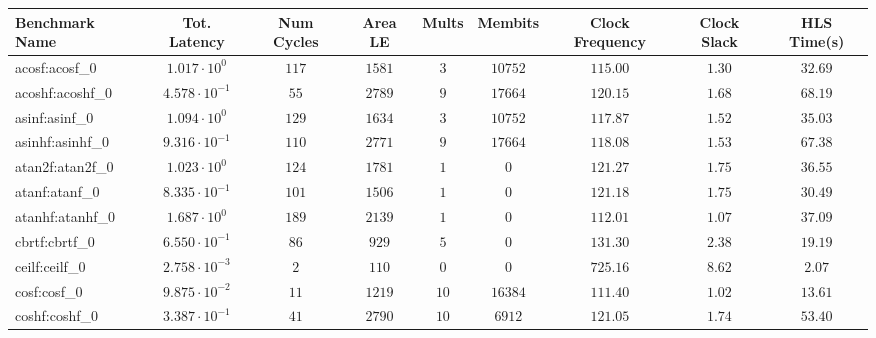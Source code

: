 \begin{tabular}{|l|c|c|c|c|c|c|c|c|}
\hline
Benchmark Name               & Tot. Latency            & Num Cycles & Area LE   & Mults   & Membits    & Clock Frequency & Clock Slack & HLS Time(s) \\
\hline
acosf:acosf\_0               & $ 1.017 \cdot 10^{0}  $ & $ 117    $ & $ 1581  $ & $ 3   $ & $ 10752  $ & $ 115.00      $ & $ 1.30    $ & $ 32.69   $ \\
acoshf:acoshf\_0             & $ 4.578 \cdot 10^{-1} $ & $ 55     $ & $ 2789  $ & $ 9   $ & $ 17664  $ & $ 120.15      $ & $ 1.68    $ & $ 68.19   $ \\
asinf:asinf\_0               & $ 1.094 \cdot 10^{0}  $ & $ 129    $ & $ 1634  $ & $ 3   $ & $ 10752  $ & $ 117.87      $ & $ 1.52    $ & $ 35.03   $ \\
asinhf:asinhf\_0             & $ 9.316 \cdot 10^{-1} $ & $ 110    $ & $ 2771  $ & $ 9   $ & $ 17664  $ & $ 118.08      $ & $ 1.53    $ & $ 67.38   $ \\
atan2f:atan2f\_0             & $ 1.023 \cdot 10^{0}  $ & $ 124    $ & $ 1781  $ & $ 1   $ & $ 0      $ & $ 121.27      $ & $ 1.75    $ & $ 36.55   $ \\
atanf:atanf\_0               & $ 8.335 \cdot 10^{-1} $ & $ 101    $ & $ 1506  $ & $ 1   $ & $ 0      $ & $ 121.18      $ & $ 1.75    $ & $ 30.49   $ \\
atanhf:atanhf\_0             & $ 1.687 \cdot 10^{0}  $ & $ 189    $ & $ 2139  $ & $ 1   $ & $ 0      $ & $ 112.01      $ & $ 1.07    $ & $ 37.09   $ \\
cbrtf:cbrtf\_0               & $ 6.550 \cdot 10^{-1} $ & $ 86     $ & $ 929   $ & $ 5   $ & $ 0      $ & $ 131.30      $ & $ 2.38    $ & $ 19.19   $ \\
ceilf:ceilf\_0               & $ 2.758 \cdot 10^{-3} $ & $ 2      $ & $ 110   $ & $ 0   $ & $ 0      $ & $ 725.16      $ & $ 8.62    $ & $ 2.07    $ \\
cosf:cosf\_0                 & $ 9.875 \cdot 10^{-2} $ & $ 11     $ & $ 1219  $ & $ 10  $ & $ 16384  $ & $ 111.40      $ & $ 1.02    $ & $ 13.61   $ \\
coshf:coshf\_0               & $ 3.387 \cdot 10^{-1} $ & $ 41     $ & $ 2790  $ & $ 10  $ & $ 6912   $ & $ 121.05      $ & $ 1.74    $ & $ 53.40   $ \\

\end{tabular}
